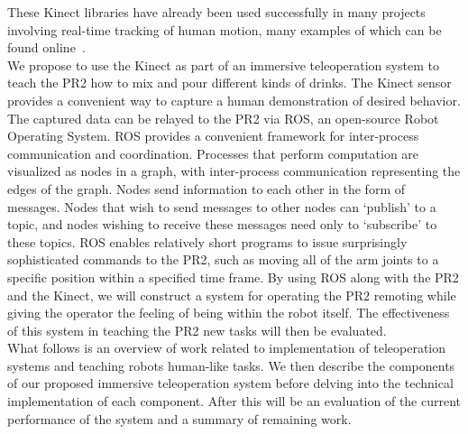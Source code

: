 \documentclass{sig-alternate}
\begin{document}
These Kinect libraries have already been used successfully in 
many projects involving real-time tracking of human motion, many examples of which can be found online~\cite{freenect}.\\
\indent We propose to use the Kinect as part of an immersive teleoperation system to teach the PR2 how to mix and pour different kinds of drinks.
The Kinect sensor provides a convenient way to capture a human demonstration of desired behavior. The captured data can be relayed to the
PR2 via ROS, an open-source Robot Operating System\cite{ros}. ROS provides a convenient framework for inter-process communication and
coordination. Processes that perform computation are visualized as nodes in a graph, with inter-process communication representing the
edges of the graph. Nodes send information to each other in the form of messages. Nodes that wish to send messages to other nodes can
`publish' to a topic, and nodes wishing to receive these messages need only to `subscribe' to these topics. ROS enables relatively short
programs to issue surprisingly sophisticated commands to the PR2, such as moving all of the arm joints to a specific position within a
specified time frame. By using ROS along with the PR2 and the Kinect, we will construct a system for operating the PR2 remoting while
giving the operator the feeling of being within the robot itself. The effectiveness of this system in teaching the PR2 new tasks will then be evaluated.\\
\indent What follows is an overview of work related to implementation of teleoperation systems and teaching robots human-like tasks. We then describe the components of our proposed immersive teleoperation system before delving into the technical implementation of each component. After this will be an evaluation of the current performance of the system and a summary of remaining work.
\end{document}
